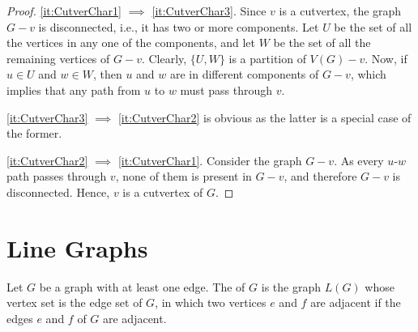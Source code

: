 \begin{proof}
\cref{it:CutverChar1} $\implies $ \cref{it:CutverChar3}. Since $v$ is a cutvertex, the graph $G - v$ is disconnected, i.e., it has two or more components. Let $U$ be the set of all the vertices in any one of the components, and let $W$ be the set of all the remaining vertices of $G - v$. Clearly, $\{U, W\}$ is a partition of $V(G) - v$. Now, if $u \in U$ and $w \in W$, then $u$ and $w$ are in different components of $G - v$, which implies that any path from $u$ to $w$ must pass through $v$.

\noindent \cref{it:CutverChar3} $\implies$ \cref{it:CutverChar2} is obvious as the latter is a special case of the former.

\noindent \cref{it:CutverChar2} $\implies$ \cref{it:CutverChar1}. Consider the graph $G - v$. As every $u$-$w$ path passes through $v$, none of them is present in $G - v$, and therefore $G - v$ is disconnected. Hence, $v$ is a cutvertex of $G$.
\end{proof}

\section{Line Graphs}\label{sec:LineGraphs}

Let $G$ be a graph with at least one edge. The  of $G$ is the graph $L(G)$ whose vertex set is the edge set of $G$, in which two vertices $e$ and $f$ are adjacent if the edges $e$ and $f$ of $G$ are adjacent.

